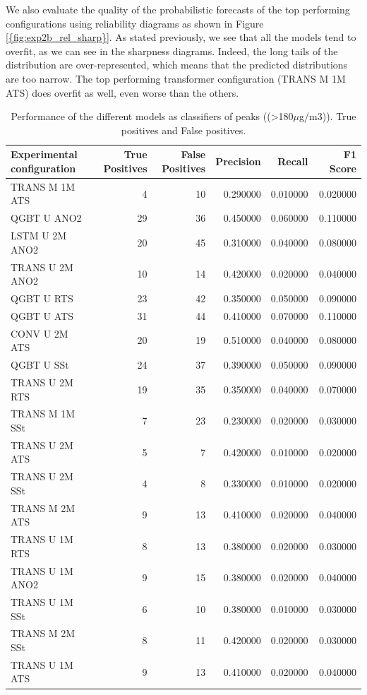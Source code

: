 \documentclass[12pt,a4paper]{book}
\begin{document}
We also evaluate the quality of the probabilistic forecasts of the top performing configurations using reliability diagrams as shown in Figure \ref{{fig:exp2b_rel_sharp}}. As stated previously, we see that all the models tend to overfit, as we can see in the sharpness diagrams. Indeed, the long tails of the distribution are over-represented, which means that the predicted distributions are too narrow. The top performing transformer configuration (TRANS M 1M ATS) does overfit as well, even worse than the others.

\begin{table}[h]
\centering
\begin{tabular}{lrrrrr}
\toprule
 Experimental configuration & True Positives & False Positives & Precision & Recall & F1 Score \\
\midrule
TRANS M 1M ATS & 4 & 10 & 0.290000 & 0.010000 & 0.020000 \\
QGBT U ANO2 & 29 & 36 & 0.450000 & 0.060000 & 0.110000 \\
LSTM U 2M ANO2 & 20 & 45 & 0.310000 & 0.040000 & 0.080000 \\
TRANS U 2M ANO2 & 10 & 14 & 0.420000 & 0.020000 & 0.040000 \\
QGBT U RTS & 23 & 42 & 0.350000 & 0.050000 & 0.090000 \\
QGBT U ATS & 31 & 44 & 0.410000 & 0.070000 & 0.110000 \\
CONV U 2M ATS & 20 & 19 & 0.510000 & 0.040000 & 0.080000 \\
QGBT U SSt & 24 & 37 & 0.390000 & 0.050000 & 0.090000 \\
TRANS U 2M RTS & 19 & 35 & 0.350000 & 0.040000 & 0.070000 \\
TRANS M 1M SSt & 7 & 23 & 0.230000 & 0.020000 & 0.030000 \\
TRANS U 2M ATS & 5 & 7 & 0.420000 & 0.010000 & 0.020000 \\
TRANS U 2M SSt & 4 & 8 & 0.330000 & 0.010000 & 0.020000 \\
TRANS M 2M ATS & 9 & 13 & 0.410000 & 0.020000 & 0.040000 \\
TRANS U 1M RTS & 8 & 13 & 0.380000 & 0.020000 & 0.030000 \\
TRANS U 1M ANO2 & 9 & 15 & 0.380000 & 0.020000 & 0.040000 \\
TRANS U 1M SSt & 6 & 10 & 0.380000 & 0.010000 & 0.030000 \\
TRANS M 2M SSt & 8 & 11 & 0.420000 & 0.020000 & 0.030000 \\
TRANS U 1M ATS & 9 & 13 & 0.410000 & 0.020000 & 0.040000 \\
\bottomrule
\end{tabular}

\caption{Performance of the different models as classifiers of peaks ((>180$\mu$g/m3)). True positives and False positives.  }
\label{tab:exp2b_classif}
\end{table}
\end{document}
